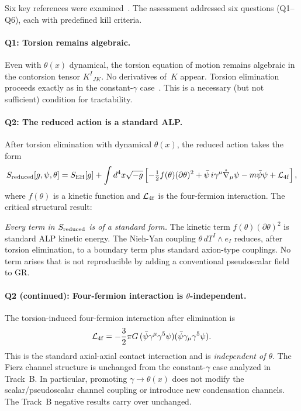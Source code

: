 \documentclass[11pt,letterpaper]{article}
\newcommand{\BI}{\gamma}               %
\begin{document}
Six key references were examined~\cite{Mercuri2009,CalcagniMercuri2009,%
TaverasYunes2008,TorresGomez2009,LattanziMercuri2010,Magueijo2013}.
The assessment addressed six questions (Q1--Q6), each with predefined
kill criteria.

\paragraph{Q1: Torsion remains algebraic.}
Even with $\theta(x)$ dynamical, the torsion equation of motion remains
algebraic in the contorsion tensor $K^I{}_{JK}$. No derivatives of~$K$
appear. Torsion elimination proceeds exactly as in the constant-$\BI$
case~\cite{CalcagniMercuri2009}. This is a necessary (but not sufficient)
condition for tractability.

\paragraph{Q2: The reduced action is a standard ALP.}
After torsion elimination with dynamical $\theta(x)$, the reduced action
takes the form~\cite{CalcagniMercuri2009,Mercuri2009}
\begin{equation}\label{eq:T1reduced}
  S_{\rm reduced}[g,\psi,\theta] = S_{\rm EH}[g]
  + \int d^4x\sqrt{-g}\left[
    -\tfrac{1}{2}f(\theta)(\partial\theta)^2
    + \bar\psi\,i\gamma^\mu\mathring\nabla_\mu\psi
    - m\bar\psi\psi
    + \mathcal{L}_{\rm 4f}
  \right],
\end{equation}
where $f(\theta)$ is a kinetic function and $\mathcal{L}_{\rm 4f}$ is the
four-fermion interaction. The critical structural result:

\emph{Every term in $S_{\rm reduced}$ is of a standard form.}
The kinetic term $f(\theta)(\partial\theta)^2$ is standard ALP kinetic
energy. The Nieh-Yan coupling $\theta\,dT^I\wedge e_I$ reduces, after
torsion elimination, to a boundary term plus standard axion-type
couplings. No term arises that is not reproducible by adding a
conventional pseudoscalar field to GR.

\paragraph{Q2 (continued): Four-fermion interaction is $\theta$-independent.}
The torsion-induced four-fermion interaction after elimination is
\begin{equation}\label{eq:T1fourfermi}
  \mathcal{L}_{\rm 4f} = -\frac{3}{2}\pi G\,
  (\bar\psi\gamma^\mu\gamma^5\psi)(\bar\psi\gamma_\mu\gamma^5\psi).
\end{equation}
This is the standard axial-axial contact interaction and is
\emph{independent of $\theta$}. The Fierz channel structure is unchanged
from the constant-$\BI$ case analyzed in Track~B. In particular, promoting
$\BI\to\theta(x)$ does not modify the scalar/pseudoscalar channel coupling
or introduce new condensation channels. The Track~B negative results carry
over unchanged.
\end{document}
